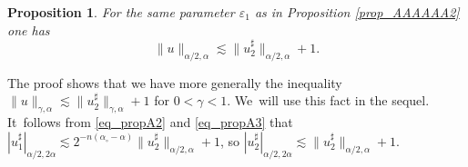 \documentclass[JEP,XML,SOM,Unicode,published]{cedram}
\newtheorem{prop}[thm]{Proposition}
\theoremstyle{definition}
\let\epsilon\varepsilon
\begin{document}
\begin{prop} \label{prop_AAAAAA3}
For the same parameter $\epsilon_1$ as in Proposition \ref{prop_AAAAAA2} one has
\begin{equation} \label{eq_propA3}
\| u \|_{\alpha / 2, \alpha} \lesssim \| u_2^{\sharp} \|_{\alpha / 2, \alpha} + 1.
\end{equation}
\end{prop}

The proof shows that we have more generally the inequality $\| u \|_{\gamma, \alpha} \lesssim \| u_2^{\sharp} \|_{\gamma, \alpha} + 1$ for $0 < \gamma < 1$. We~will use this fact in the sequel. It~follows from \eqref{eq_propA2} and \eqref{eq_propA3} that $| u_1^{\sharp} |_{\alpha / 2, 2 \alpha} {\lesssim 2^{- n (\alpha_{\circ} - \alpha)}} \| u_2^{\sharp} \|_{\alpha / 2, \alpha} + 1$, so $| u_2^{\sharp} |_{\alpha / 2, 2 \alpha} \lesssim \| u_2^{\sharp} \|_{\alpha / 2, \alpha} + 1$.
\end{document}
